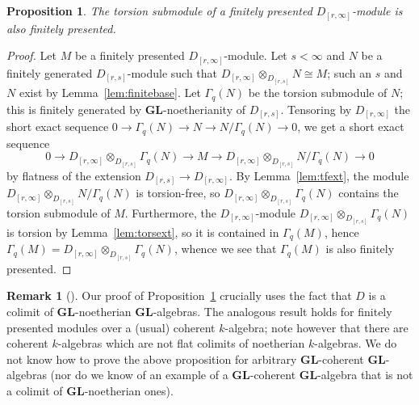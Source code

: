 \documentclass[12pt]{amsart}
\newcommand{\Drs}{D_{[r,s]}}
\newcommand{\Drinfty}{D_{[r,\infty]}}
\newcommand{\GL}{\mathbf{GL}}
\newcommand{\mGaq}{\Gamma_{q}}
\numberwithin{equation}{section}
\newtheorem{proposition}[equation]{Proposition}
\theoremstyle{definition}
\newtheorem{rmk}[equation]{Remark}
\newenvironment{remark}[1][]{\begin{rmk}[#1] \pushQED{\qed}}{\popQED \end{rmk}}
\theoremstyle{plain}
\begin{document}
\begin{proposition} \label{prop:torsionfp}
    The torsion submodule of a finitely presented $\Drinfty$-module is also finitely presented.
\end{proposition} 
\begin{proof}
   Let $M$ be a finitely presented $\Drinfty$-module. Let $s< \infty$ and $N$ be a finitely generated $\Drs$-module such that $\Drinfty \otimes_{\Drs} N \cong M$; such an $s$ and $N$ exist by Lemma~\ref{lem:finitebase}. Let $\mGaq(N)$ be the torsion submodule of $N$; this is finitely generated by $\GL$-noetherianity of $\Drs$. Tensoring by $\Drinfty$ the short exact sequence $0 \to \mGaq(N) \to N \to N/\mGaq(N) \to 0$, we get a short exact sequence 
   \[
    0 \to \Drinfty \otimes_{\Drs} \mGaq(N) \to M \to \Drinfty \otimes_{\Drs} N/\mGaq(N) \to 0
   \]
   by flatness of the extension $\Drs \to \Drinfty$. By Lemma~\ref{lem:tfext}, the module 
   $\Drinfty \otimes_{\Drs} N/\mGaq(N)$ is torsion-free, so 
   $\Drinfty \otimes_{\Drs} \mGaq(N)$ contains the torsion submodule of $M$. Furthermore, the $\Drinfty$-module $\Drinfty \otimes_{\Drs} \mGaq(N)$ is torsion by Lemma~\ref{lem:torsext}, so it is contained in $\mGaq(M)$, hence $\mGaq(M) = \Drinfty \otimes_{\Drs} \mGaq(N)$, whence we see that $\mGaq(M)$ is also finitely presented.
\end{proof}
\begin{remark}
Our proof of Proposition~\ref{prop:torsionfp} crucially uses the fact that $D$ is a colimit of $\GL$-noetherian $\GL$-algebras. The analogous result holds for finitely presented modules over a (usual) coherent $k$-algebra; note however that there are coherent $k$-algebras which are not flat colimits of noetherian $k$-algebras. We do not know how to prove the above proposition for arbitrary $\GL$-coherent $\GL$-algebras (nor do we know of an example of a $\GL$-coherent $\GL$-algebra that is not a colimit of $\GL$-noetherian ones).
\end{remark}
\end{document}

